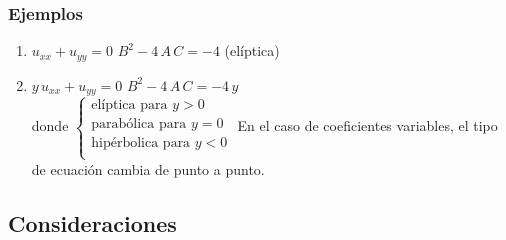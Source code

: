 \documentclass[12pt]{beamer}
\begin{document}
\begin{frame}
\frametitle{Ejemplos}
\begin{enumerate}[<+->]
\setlength\itemsep{1em}
\conti
\item $u_{xx} + u_{yy} = 0$ \hspace{1cm} $B^{2} - 4 \, A \, C = -4$ \hspace{0.6cm} (elíptica)
\item $y \, u_{xx} + u_{yy} = 0$ \hspace{0.6cm} $B^{2} - 4 \, A \, C = - 4 \, y$
\\
donde $\begin{cases}
\mbox{elíptica para } y > 0 \\
\mbox{parabólica para } y = 0 \\
\mbox{hipérbolica para } y < 0 \\
\end{cases}$
\newline
En el caso de coeficientes variables, el tipo de ecuación cambia de punto a punto.
\end{enumerate}
\end{frame}

\subsection*{Consideraciones}
\end{document}
